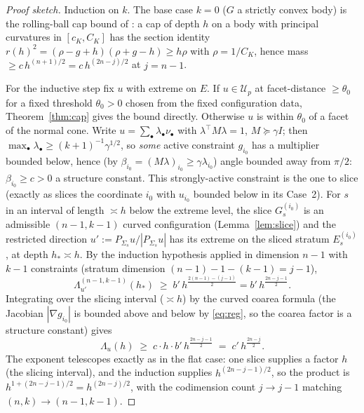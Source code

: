 \documentclass[11pt]{article}
\begin{document}
\begin{proof}[Proof sketch]
Induction on $k$.  The base case $k=0$ ($G$ a strictly convex body) is the
rolling-ball cap bound of \cite{companion4}: a cap of depth $h$ on a body with
principal curvatures in $[c_K,C_K]$ has the section identity
$r(h)^2=(\rho-g+h)(\rho+g-h)\ge h\rho$ with $\rho=1/C_K$, hence mass
$\ge c\,h^{(n+1)/2}=c\,h^{(2n-j)/2}$ at $j=n-1$.

For the inductive step fix $u$ with extreme on $E$.  If $u\in\mathcal U_p$ at
facet-distance $\ge\theta_0$ for a fixed threshold $\theta_0>0$ chosen from the
fixed configuration data,
Theorem~\ref{thm:cap} gives the bound directly.  Otherwise $u$ is within
$\theta_0$ of a facet of the normal cone.  Write $u=\sum_\bullet\lambda_\bullet
\nu_\bullet$ with $\lambda^\top M\lambda=1$, $M\succeq\gamma I$; then
$\max_\bullet\lambda_\bullet\ge(k+1)^{-1}\gamma^{1/2}$, so \emph{some} active
constraint $g_{i_0}$ has a multiplier bounded below, hence (by
$\beta_{i_0}=(M\lambda)_{i_0}\ge\gamma\lambda_{i_0}$) angle bounded away from
$\pi/2$: $\beta_{i_0}\ge c>0$ a structure constant.  This strongly-active
constraint is the one to slice (exactly as \cite{companion11} slices the
coordinate $i_0$ with $u_{i_0}$ bounded below in its Case~2).  For $s$ in an interval of length $\asymp h$ below the
extreme level, the slice $G^{(i_0)}_s$ is an admissible $(n-1,k-1)$ curved
configuration (Lemma~\ref{lem:slice}) and the restricted direction
$u':=P_{\Sigma_s}u/|P_{\Sigma_s}u|$ has its extreme on the sliced stratum
$E^{(i_0)}_s$, at depth $h_*\asymp h$.  By the induction hypothesis applied in
dimension $n-1$ with $k-1$ constraints (stratum dimension
$(n-1)-1-(k-1)=j-1$),
\[
\Lambda^{(n-1,k-1)}_{u'}(h_*)\;\ge\;b'\,h^{\frac{2(n-1)-(j-1)}2}
=b'\,h^{\frac{2n-j-1}2}.
\]
Integrating over the slicing interval ($\asymp h$) by the curved coarea formula
(the Jacobian $|\nabla g_{i_0}|$ is bounded above and below by \eqref{eq:reg},
so the coarea factor is a structure constant) gives
\[
\Lambda_u(h)\;\ge\;c\cdot h\cdot b'\,h^{\frac{2n-j-1}2}
\;=\;c'\,h^{\frac{2n-j}2}.
\]
The exponent telescopes exactly as in the flat case: one slice supplies a factor
$h$ (the slicing interval), and the induction supplies
$h^{(2n-j-1)/2}$, so the product is $h^{1+(2n-j-1)/2}=h^{(2n-j)/2}$, with the
codimension count $j\to j-1$ matching $(n,k)\to(n-1,k-1)$.
\end{proof}
\end{document}
